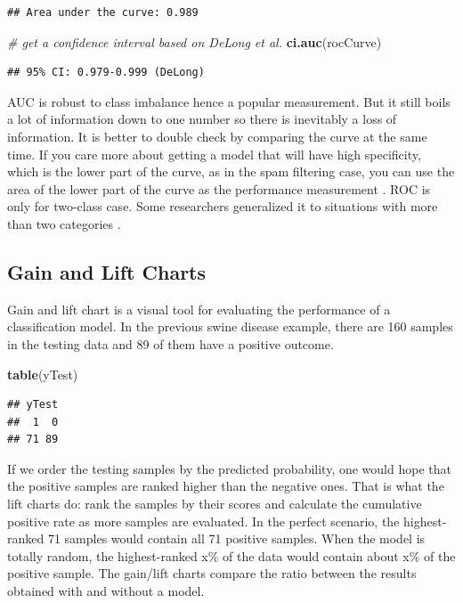 \documentclass[12pt,]{krantz}
\makeatletter
\newenvironment{Shaded}{\begin{snugshade}}{\end{snugshade}}
\newcommand{\CommentTok}[1]{\textcolor[rgb]{0.37,0.37,0.37}{\textit{#1}}}
\newcommand{\KeywordTok}[1]{\textcolor[rgb]{0.27,0.27,0.27}{\textbf{#1}}}
\newcommand{\NormalTok}[1]{#1}
\newenvironment{kframe}{%
\medskip{}
\setlength{\fboxsep}{.8em}
 \def\at@end@of@kframe{}%
 \ifinner\ifhmode%
  \def\at@end@of@kframe{\end{minipage}}%
  \begin{minipage}{\columnwidth}%
 \fi\fi%
 \def\FrameCommand##1{\hskip\@totalleftmargin \hskip-\fboxsep
 \colorbox{shadecolor}{##1}\hskip-\fboxsep
     \hskip-\linewidth \hskip-\@totalleftmargin \hskip\columnwidth}%
 \MakeFramed {\advance\hsize-\width
   \@totalleftmargin\z@ \linewidth\hsize
   \@setminipage}}%
 {\par\unskip\endMakeFramed%
 \at@end@of@kframe}
\renewenvironment{Shaded}{\begin{kframe}}{\end{kframe}}
\makeatother
\begin{document}
\begin{verbatim}
## Area under the curve: 0.989
\end{verbatim}

\begin{Shaded}
\begin{Highlighting}[]
\CommentTok{# get a confidence interval based on DeLong et al.}
\KeywordTok{ci.auc}\NormalTok{(rocCurve)}
\end{Highlighting}
\end{Shaded}

\begin{verbatim}
## 95% CI: 0.979-0.999 (DeLong)
\end{verbatim}

AUC is robust to class imbalance\citep{Provost1998, Fawcett2006} hence a popular measurement. But it still boils a lot of information down to one number so there is inevitably a loss of information. It is better to double check by comparing the curve at the same time. If you care more about getting a model that will have high specificity, which is the lower part of the curve, as in the spam filtering case, you can use the area of the lower part of the curve as the performance measurement \citep{McClish1989}. ROC is only for two-class case. Some researchers generalized it to situations with more than two categories \citep{Hand2001, Lachiche2003, Li2008}.

\hypertarget{gain-and-lift-charts}{%
\subsection{Gain and Lift Charts}\label{gain-and-lift-charts}}

Gain and lift chart is a visual tool for evaluating the performance of a classification model. In the previous swine disease example, there are 160 samples in the testing data and 89 of them have a positive outcome.

\begin{Shaded}
\begin{Highlighting}[]
\KeywordTok{table}\NormalTok{(yTest)}
\end{Highlighting}
\end{Shaded}

\begin{verbatim}
## yTest
##  1  0 
## 71 89
\end{verbatim}

If we order the testing samples by the predicted probability, one would hope that the positive samples are ranked higher than the negative ones. That is what the lift charts do: rank the samples by their scores and calculate the cumulative positive rate as more samples are evaluated. In the perfect scenario, the highest-ranked 71 samples would contain all 71 positive samples. When the model is totally random, the highest-ranked x\% of the data would contain about x\% of the positive sample. The gain/lift charts compare the ratio between the results obtained with and without a model.
\end{document}
